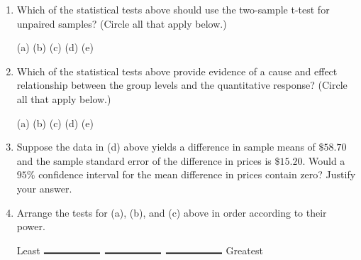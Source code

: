 \documentclass[12pt]{article}
\begin{document}
\begin{enumerate}[leftmargin=\labelsep]
\item Which of the statistical tests above should use the two-sample t-test for unpaired samples? (Circle all that apply below.)
\vspace{1cm}
\begin{center}{(a) \hspace{3cm}(b) \hspace{3cm} (c) \hspace{3cm} (d) \hspace{3cm} (e)}\end{center}
\vspace{1cm}
\item Which of the statistical tests above provide evidence of a cause and effect relationship between the group levels and the quantitative response? (Circle all that apply below.)
\vspace{1cm}
\begin{center}{(a) \hspace{3cm}(b) \hspace{3cm} (c) \hspace{3cm} (d) \hspace{3cm} (e)}\end{center}
\vspace{1cm}
\item Suppose the data in (d) above yields a difference in sample means of $\$58.70$ and the sample standard error of the difference in prices is $\$15.20$. Would a $95\%$ confidence interval for the mean difference in prices contain zero? Justify your answer. 
\vspace{3cm}

\item Arrange the tests for (a), (b), and (c) above in order according to their power. 
\vspace{2cm}
\begin{center}{Least \hspace{0.4mm}$\rule{2cm}{0.5mm}$ \hspace{3cm} $\rule{2cm}{0.5mm}$ \hspace{3cm}$\rule{2cm}{0.5mm}$ \hspace{0.4mm} Greatest}\end{center}


\end{enumerate}
\end{document}
